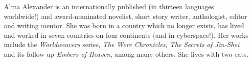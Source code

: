 Alma Alexander is an internationally published (in thirteen languages worldwide!) and award-nominated novelist, short story writer, anthologist, editor and writing mentor. She was born in a country which no longer exists, has lived and worked in seven countries on four continents (and in cyberspace!). Her works include the \emph{Worldweavers} series, \emph{The Were Chronicles}, \emph{The Secrets of Jin-Shei} and its follow-up \emph{Embers of Heaven}, among many others. She lives with two cats.